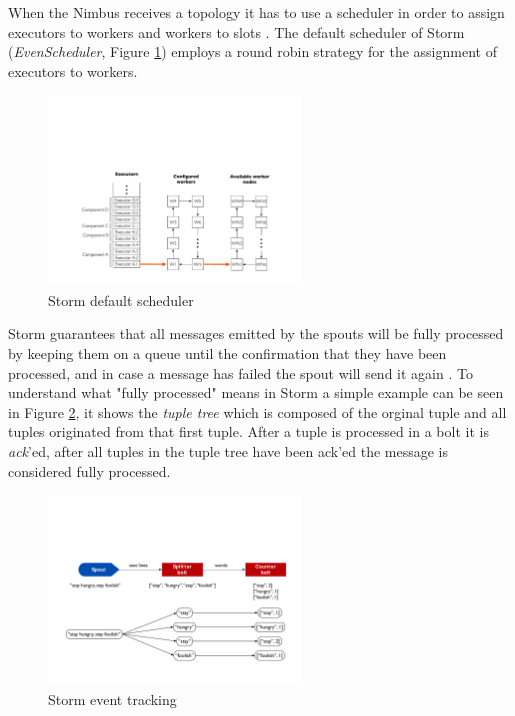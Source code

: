 \documentclass[ppgc,diss,english]{iiufrgs}
\begin{document}
When the Nimbus receives a topology it has to use a scheduler in order to assign executors to workers and workers to slots \cite{aniello2013adaptive}. The default scheduler of Storm (\emph{EvenScheduler}, Figure \ref{fig:storm_default_scheduler}) employs a round robin strategy for the assignment of executors to workers.

\begin{figure}[!ht]
	\centering
	\includegraphics[width=0.6\textwidth]{images/storm/default_scheduler.pdf}
	\caption[Storm default scheduler]{Storm default scheduler \cite{heinze2014cloud}}
	\label{fig:storm_default_scheduler}
\end{figure}

Storm guarantees that all messages emitted by the spouts will be fully processed by keeping them on a queue until the confirmation that they have been processed, and in case a message has failed the spout will send it again \cite{gradvohl2014comparing}. To understand what "fully processed" means in Storm a simple example can be seen in Figure \ref{fig:storm_event_tracking}, it shows the \emph{tuple tree} which is composed of the orginal tuple and all tuples originated from that first tuple. After a tuple is processed in a bolt it is \emph{ack}'ed, after all tuples in the tuple tree have been ack'ed the message is considered fully processed.

\begin{figure}[!ht]
	\centering
	\includegraphics[width=0.6\textwidth]{images/storm/event_tracking.pdf}
	\caption[Storm event tracking]{Storm event tracking \cite{heinze2014cloud}}
	\label{fig:storm_event_tracking}
\end{figure}
\end{document}
